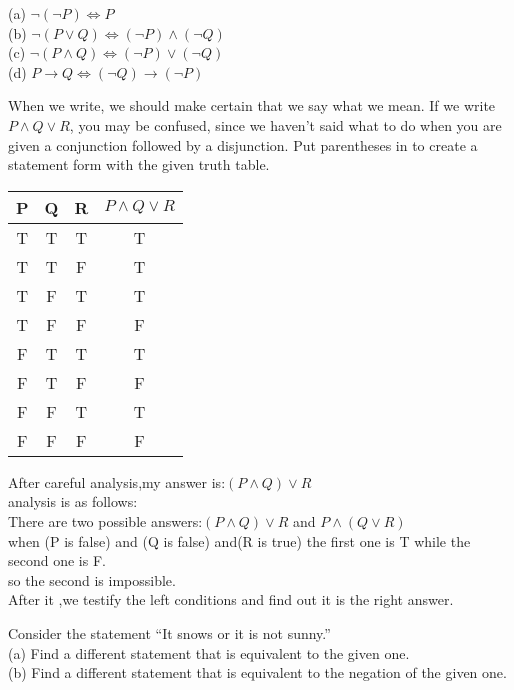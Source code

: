 \documentclass[11pt, a4paper, UTF8]{ctexart}
\begin{document}
\begin{solution}
(a) $\neg(\neg P) \Leftrightarrow P$\\
(b) $\neg(P \vee Q) \Leftrightarrow (\neg P)\wedge (\neg Q)$\\
(c) $\neg(P \wedge Q) \Leftrightarrow (\neg P) \vee (\neg Q)$\\
(d) $P \rightarrow Q \Leftrightarrow (\neg Q) \rightarrow (\neg P)$
\end{solution}





\begin{problem}[UD:2.8]
When we write, we should make certain that we say what we mean. If we write $P \wedge Q \vee R$, you may be confused, since we haven’t said what to do when you are given a conjunction followed by a disjunction. Put parentheses in to create a statement form with the given truth table.\\
\begin{tabular}{|c|c|c|c|}
\hline
P & Q & R & $P \wedge Q \vee R$\\
\hline
T&T&T&T\\
\hline
T&T&F&T\\
\hline
T&F&T&T\\
\hline
T&F&F&F\\
\hline
F&T&T&T\\
\hline
F&T&F&F\\
\hline
F&F&T&T\\
\hline
F&F&F&F\\
\hline
\end{tabular}
\end{problem}

\begin{solution}
After careful analysis,my answer is:$(P \wedge Q) \vee R$\\
analysis is as follows:\\
There are two possible answers:$(P \wedge Q) \vee R$ and $P \wedge (Q \vee R)$\\
when (P is false) and (Q is false) and(R is true) the first one is T while the second one is F.\\
so the second is impossible.\\
After it ,we testify the left conditions and find out it is the right answer.
\end{solution}



\begin{problem}[UD:2.10]
Consider the statement “It snows or it is not sunny.” \\
(a) Find a different statement that is equivalent to the given one.\\
(b) Find a different statement that is equivalent to the negation of the given one.
\end{problem}
\end{document}
